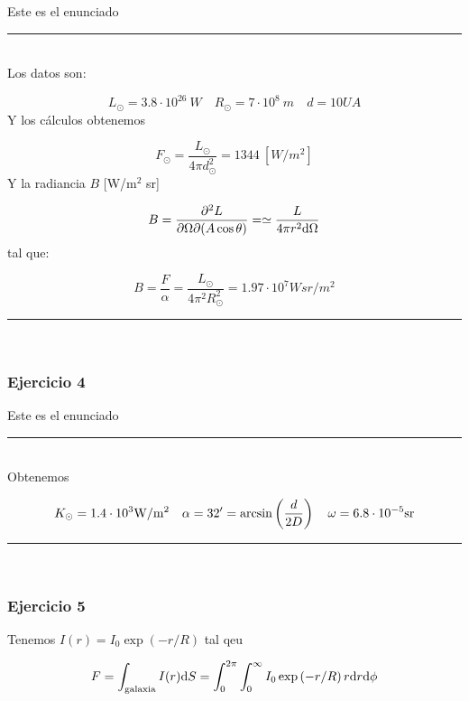 Este es el enunciado 

\rule{\textwidth}{0.1pt} \\[2pt]

Los datos son: 

\begin{equation}
    L_{\odot} = 3.8 \cdot 10^{26} \ \unit{W} \quad R_{\odot} = 7\cdot 10^8 \ \unit{m} \quad d = 10 \unit{UA}    
\end{equation}
Y los cálculos obtenemos

\begin{equation}
    F_{\odot} = \frac{L_{\odot}}{4\pi d_{\odot}^2} = 1344 \ [\unit{W/m^2}]
\end{equation}
Y la radiancia $B$ [W/m$^2$ sr]

\begin{equation}
    B = \frac{\partial^2 L}{\partial \Omega \partial (A \cos \theta)} = \simeq \frac{L}{4\pi r^2 \mathrm{d} \Omega}
\end{equation}
tal que:

\begin{equation}
    B = \frac{F}{\alpha} = \frac{L_{\odot}}{4\pi^2 R_{\odot}^2} = 1.97 \cdot 10^7 \unit{W sr/ m^2}
\end{equation}


\rule{\textwidth}{0.1pt} \\[2pt]

\subsubsection{Ejercicio 4}

Este es el enunciado

\rule{\textwidth}{0.1pt} \\[2pt]

Obtenemos 

\begin{equation}
    K_\odot = 1.4 \cdot 10^3 \unit{W/m^2} \quad \alpha = 32'= \arcsin \parentesis{\frac{d}{2D}} \quad \omega = 6.8 \cdot 10^{-5} \unit{sr}
\end{equation}

\rule{\textwidth}{0.1pt} \\[2pt]

\subsubsection{Ejercicio 5}

Tenemos $I(r)=I_0\exp (-r/R)$ tal qeu 

\begin{equation}
    F = \int_{\text{galaxia}} I(r) \mathrm{d} S = \int_{0}^{2\pi} \int_{0}^{\infty} I_0 \exp \left( -r/R \right) r \mathrm{d} r \mathrm{d} \phi
\end{equation}

